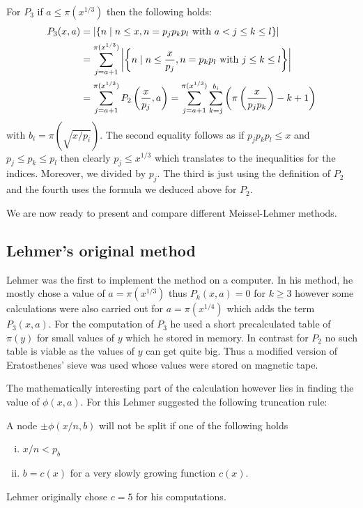 For $P_3$ if $a \leq \pi(x^{1 / 3})$ then the following holds:
\begin{align*}
	P_3(x,a) &= \abs{\{n \mid n \leq x, n = p_{j} p_{k} p_{l} \text{ with } a < j \leq k \leq l\} }\\
			 &=  \sum_{j=a+1}^{\pi(x^{1 / 3})} \abs{\left\{ n \mid n \leq \frac{x}{p_{j}}, n = p_{k} p_{l} \text{ with } j \leq k \leq l \right\} } \\
			 &= \sum_{j=a+1}^{\pi(x^{1 / 3})} P_2\left(\frac{x}{p_{j}},a\right) 
			 = \sum_{j = a+1}^{\pi(x^{1 / 3})} \sum_{k = j}^{b_{i}} \left( \pi\left(\frac{x}{p_{j}p_{k}}\right) -k + 1 \right)
\end{align*}
with $b_{i} = \pi(\sqrt{x / p_{i}})$.
The second equality follows as if $p_{j} p_{k} p_{l} \leq x$ and $p_{j} \leq p_{k} \leq p_{l}$
then clearly $p_{j} \leq x^{1 /3}$ which translates to the inequalities for the indices. Moreover, we divided by $p_{j}$.
The third is just using the definition of $P_2$ and the fourth uses the formula we deduced above for $P_2$.

We are now ready to present and compare different Meissel-Lehmer methods.

\subsection{Lehmer's original method}
Lehmer was the first to implement the method on a computer.
In his method, he mostly chose a value of $a = \pi(x^{1 / 3})$ thus $P_{k}(x,a) = 0$ for $k \geq 3$ 
however some calculations were also carried out for $a = \pi(x^{1 / 4})$ which adds the term $P_{3}(x,a)$.
For the computation of $P_{3}$ he used a short precalculated table of $\pi(y)$ for small values of $y$ which he stored in memory.
In contrast for $P_2$ no such table is viable as the values of $y$ can get quite big. Thus 
a modified version of Eratosthenes' sieve was used whose values were stored on magnetic tape.

The mathematically interesting part of the calculation however lies in finding the value of $\phi(x,a)$.
For this Lehmer suggested the following truncation rule:

\begin{definition}
	A node $\pm \phi(x / n , b)$ will not be split if one of the following holds
	\begin{enumerate}[(i)]
		\item $x / n  < p_{b}$
		\item $b = c(x)$ for a very slowly growing function $c(x)$.
	\end{enumerate}
\end{definition}
Lehmer originally chose $c = 5$ for his computations.

